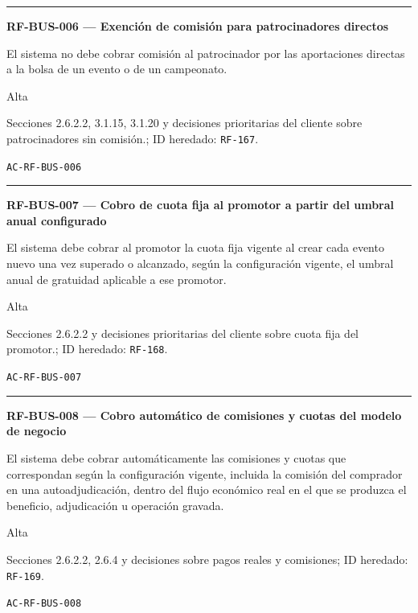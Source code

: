 \documentclass[10pt,letterpaper]{article}
\begin{document}
\vspace{0.25em}\hrule\vspace{0.65em}
\noindent\textbf{RF-BUS-006 --- Exención de comisión para patrocinadores directos}\par
\begin{description}[style=nextline,leftmargin=3.15cm,labelwidth=2.8cm,font=\normalfont\bfseries]
\item[Obligación] El sistema no debe cobrar comisión al patrocinador por las aportaciones directas a la bolsa de un evento o de un campeonato.
\item[Prioridad] Alta
\item[Procedencia] Secciones 2.6.2.2, 3.1.15, 3.1.20 y decisiones prioritarias del cliente sobre patrocinadores sin comisión.; ID heredado: \texttt{RF-167}.
\item[Verificación] \texttt{AC-RF-BUS-006}
\end{description}
\vspace{0.25em}\hrule\vspace{0.65em}
\noindent\textbf{RF-BUS-007 --- Cobro de cuota fija al promotor a partir del umbral anual configurado}\par
\begin{description}[style=nextline,leftmargin=3.15cm,labelwidth=2.8cm,font=\normalfont\bfseries]
\item[Obligación] El sistema debe cobrar al promotor la cuota fija vigente al crear cada evento nuevo una vez superado o alcanzado, según la configuración vigente, el umbral anual de gratuidad aplicable a ese promotor.
\item[Prioridad] Alta
\item[Procedencia] Secciones 2.6.2.2 y decisiones prioritarias del cliente sobre cuota fija del promotor.; ID heredado: \texttt{RF-168}.
\item[Verificación] \texttt{AC-RF-BUS-007}
\end{description}
\vspace{0.25em}\hrule\vspace{0.65em}
\noindent\textbf{RF-BUS-008 --- Cobro automático de comisiones y cuotas del modelo de negocio}\par
\begin{description}[style=nextline,leftmargin=3.15cm,labelwidth=2.8cm,font=\normalfont\bfseries]
\item[Obligación] El sistema debe cobrar automáticamente las comisiones y cuotas que correspondan según la configuración vigente, incluida la comisión del comprador en una autoadjudicación, dentro del flujo económico real en el que se produzca el beneficio, adjudicación u operación gravada.
\item[Prioridad] Alta
\item[Procedencia] Secciones 2.6.2.2, 2.6.4 y decisiones sobre pagos reales y comisiones; ID heredado: \texttt{RF-169}.
\item[Verificación] \texttt{AC-RF-BUS-008}
\end{description}
\end{document}
